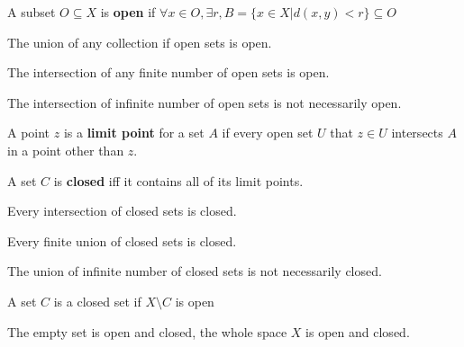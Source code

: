 			\begin{definition}
				A subset $O \subseteq X$ is \textbf{open} if $\forall x \in O, \exists r, B=\{x\in X|d(x, y) < r\} \subseteq O$
			\end{definition}

			\begin{theorem}
				The union of any collection if open sets is open.
			\end{theorem}

			\begin{theorem}
				The intersection of any finite number of open sets is open.
			\end{theorem}

			\begin{remark}
				The intersection of infinite number of open sets is not necessarily open.
			\end{remark}

			\begin{definition}
				A point $z$ is a \textbf{limit point} for a set $A$ if every open set $U$ that $z\in U$ intersects $A$ in a point other than $z$.
			\end{definition}


			\begin{definition}
				A set $C$ is \textbf{closed} iff it contains all of its limit points.
			\end{definition}

			\begin{theorem}
				Every intersection of closed sets is closed.
			\end{theorem}

			\begin{theorem}
				Every finite union of closed sets is closed.
			\end{theorem}

			\begin{remark}
				The union of infinite number of closed sets is not necessarily closed.
			\end{remark}

			\begin{theorem}
				A set $C$ is a closed set if $X \setminus C$ is open
			\end{theorem}

			\begin{remark}
				The empty set is open and closed, the whole space $X$ is open and closed.
			\end{remark}